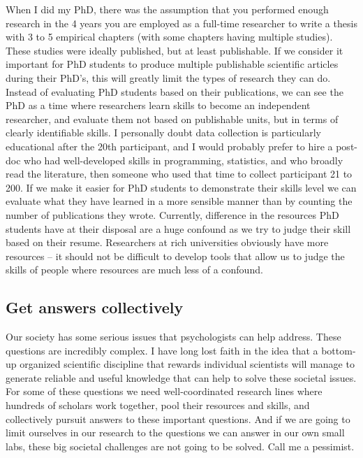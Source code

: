 \documentclass[
]{krantz}
\begin{document}
When I did my PhD, there was the assumption that you performed enough research in the 4 years you are employed as a full-time researcher to write a thesis with 3 to 5 empirical chapters (with some chapters having multiple studies). These studies were ideally published, but at least publishable. If we consider it important for PhD students to produce multiple publishable scientific articles during their PhD's, this will greatly limit the types of research they can do. Instead of evaluating PhD students based on their publications, we can see the PhD as a time where researchers learn skills to become an independent researcher, and evaluate them not based on publishable units, but in terms of clearly identifiable skills. I personally doubt data collection is particularly educational after the 20th participant, and I would probably prefer to hire a post-doc who had well-developed skills in programming, statistics, and who broadly read the literature, then someone who used that time to collect participant 21 to 200. If we make it easier for PhD students to demonstrate their skills level we can evaluate what they have learned in a more sensible manner than by counting the number of publications they wrote. Currently, difference in the resources PhD students have at their disposal are a huge confound as we try to judge their skill based on their resume. Researchers at rich universities obviously have more resources -- it should not be difficult to develop tools that allow us to judge the skills of people where resources are much less of a confound.

\hypertarget{get-answers-collectively}{%
\subsection{Get answers collectively}\label{get-answers-collectively}}

Our society has some serious issues that psychologists can help address. These questions are incredibly complex. I have long lost faith in the idea that a bottom-up organized scientific discipline that rewards individual scientists will manage to generate reliable and useful knowledge that can help to solve these societal issues. For some of these questions we need well-coordinated research lines where hundreds of scholars work together, pool their resources and skills, and collectively pursuit answers to these important questions. And if we are going to limit ourselves in our research to the questions we can answer in our own small labs, these big societal challenges are not going to be solved. Call me a pessimist.
\end{document}
